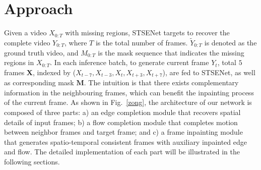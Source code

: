 \section{Approach}
Given a video \(X_{0:T}\) with missing regions, STSENet targets to recover the complete video \(Y_{0:T}\), where $T$ is the total number of frames.
\( \widetilde{Y}_{0:T}\) is denoted as the ground truth video, and \(M_{0:T}\) is the mask sequence that indicates the missing regions in \(X_{0:T}\).
In each inference batch, to generate current frame \(Y_t\), total $5$ frames $\boldsymbol{X}$, indexed by (\(X_{t-7}, X_{t-3}, X_{t} ,X_{t+3}, X_{t+7}\)), are fed to STSENet, as well as corresponding mask $\boldsymbol{M}$.  
The intuition is that there exists complementary information in the neighbouring frames, which can benefit the inpainting process of the current frame.
As shown in Fig.~\ref{zong}, the architecture of our network is composed of three parts: a) an edge completion module that recovers spatial details of input frames; b) a flow completion module that completes motion between neighbor frames and target frame; and c) a frame inpainting module that generates spatio-temporal consistent frames with auxiliary inpainted edge and flow.
The detailed implementation of each part will be illustrated in the following sections.







